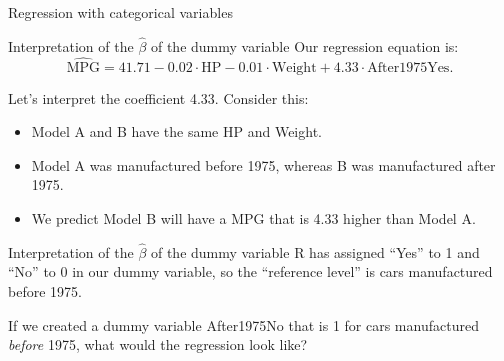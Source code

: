 \documentclass{beamer}\usepackage[]{graphicx}\usepackage[]{color}
\newenvironment{knitrout}{}{} %
\begin{document}
\begin{darkframes}
\begin{frame}[fragile]{Regression with categorical variables}
\begin{knitrout}
\end{knitrout}
\end{frame}
      
      
      
\begin{frame}[fragile]{Interpretation of the $\hat\beta$ of the dummy variable}
        Our regression equation is:
        \[
          \widehat{\text{MPG}} = 41.71 -
          0.02 \cdot \text{HP} -
          0.01 \cdot \text{Weight} +
          4.33 \cdot \text{After1975Yes}.
        \] 
        \pause

        Let's interpret the coefficient 4.33.
        Consider this:
        \begin{itemize}[<+->]
          \item Model A and B have the same HP and Weight.
          \item Model A was manufactured before 1975, whereas B was manufactured after 1975.
          \item We predict Model B will have a MPG that is 4.33 higher than Model A.
        \end{itemize} 
        \lc
\end{frame}
      
      
      
      
\begin{frame}[fragile]{Interpretation of the $\hat\beta$ of the dummy variable}
        R has assigned ``Yes'' to 1 and ``No'' to 0 in our dummy variable, so the ``reference level'' is cars manufactured before 1975.
        \pause\bigskip
	
        If we created a dummy variable After1975No that is 1 for cars manufactured \emph{before} 1975, what would the regression look like?          
\end{frame}
      
      
      
      
      
      
      

\end{darkframes}
\end{document}
